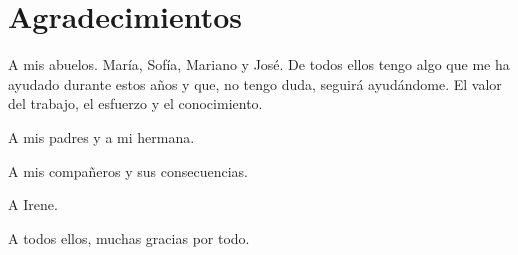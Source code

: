 \chapter{Agradecimientos}

A mis abuelos. María, Sofía, Mariano y José. De todos ellos tengo algo que me ha ayudado durante estos años y que, no tengo duda, seguirá ayudándome. El valor del trabajo, el esfuerzo y el conocimiento.

A mis padres y a mi hermana.

A mis compañeros y sus consecuencias.

A Irene.

A todos ellos, muchas gracias por todo.